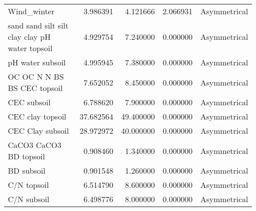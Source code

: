\begin{tabular}{lrrrl}
Wind_winter & 3.986391 & 4.121666 & 2.066931 & Asymmetrical \\
sand %
sand %
silt %
silt%
clay %
clay %
pH water topsoil & 4.929754 & 7.240000 & 0.000000 & Asymmetrical \\
pH water subsoil & 4.995945 & 7.380000 & 0.000000 & Asymmetrical \\
OC %
OC %
N %
N %
BS %
BS %
CEC topsoil & 7.652052 & 8.450000 & 0.000000 & Asymmetrical \\
CEC subsoil & 6.788620 & 7.900000 & 0.000000 & Asymmetrical \\
CEC clay topsoil & 37.682564 & 49.400000 & 0.000000 & Asymmetrical \\
CEC Clay subsoil & 28.972972 & 40.000000 & 0.000000 & Asymmetrical \\
CaCO3 %
CaCO3 %
BD topsoil & 0.908460 & 1.340000 & 0.000000 & Asymmetrical \\
BD subsoil & 0.901548 & 1.260000 & 0.000000 & Asymmetrical \\
C/N topsoil & 6.514790 & 8.600000 & 0.000000 & Asymmetrical \\
C/N subsoil & 6.498776 & 8.000000 & 0.000000 & Asymmetrical \\
\bottomrule
\end{tabular}
